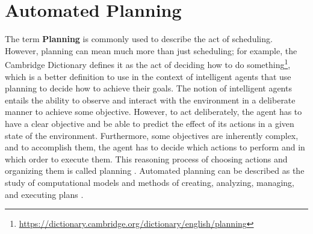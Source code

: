 \section{Automated Planning}

The term \textbf{Planning} is commonly used to describe the act of 
scheduling. However, planning can mean much more than just
scheduling; for example, the Cambridge Dictionary defines 
it as the act of deciding how to do something\footnote{\url{https://dictionary.cambridge.org/dictionary/english/planning}}, 
which is a better definition to use in the context of intelligent agents that 
use planning to decide how to achieve their goals. The notion of intelligent agents entails the ability to observe and interact 
with the environment in a deliberate manner to achieve some objective. 
However, to act deliberately, the agent has to have a clear objective 
and be able to predict the effect of its actions in a given state of 
the environment. Furthermore, some objectives are inherently complex, and to accomplish them, 
the agent has to decide which actions to perform and in which order to execute 
them. This reasoning process of choosing actions and organizing them 
is called planning \cite{AutomatedPlanningTheoryghallab2006}. 
Automated planning can be described as the study of computational models and methods 
of creating, analyzing, managing, and 
executing plans \cite{IntroductionPlanningDomainhaslum2019}.



